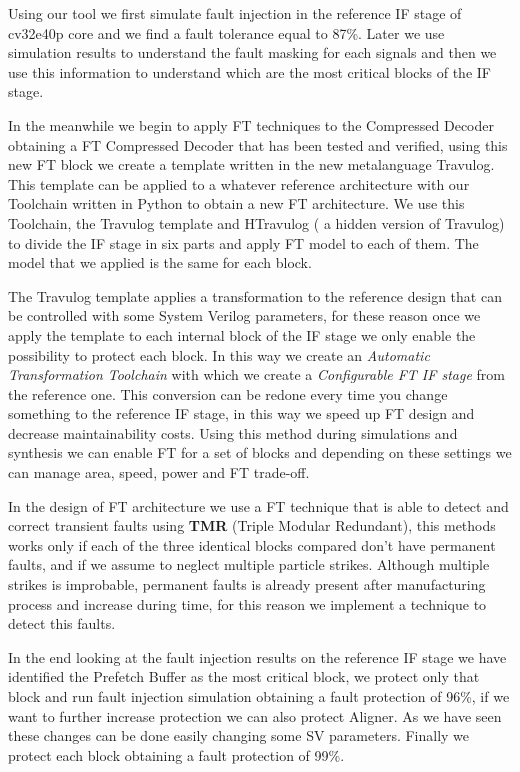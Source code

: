 \documentclass[corpo=11pt,english,numerazioneromana]{toptesi}
\begin{document}
Using our tool we first simulate fault injection in the reference IF stage of cv32e40p core and we find a fault tolerance equal to 87\%. Later we use simulation results to understand the fault masking for each signals and then we use this information to understand which are the most critical blocks of the IF stage. 

In the meanwhile we begin to apply FT techniques to the Compressed Decoder obtaining a FT Compressed Decoder that has been tested and verified, using this new FT block we create a template written in the new metalanguage Travulog. This template can be applied to a whatever reference architecture with our Toolchain written in Python to obtain a new FT architecture. We use this Toolchain, the Travulog template and HTravulog ( a hidden version of Travulog) to divide the IF stage in six parts and apply FT model to each of them. The model that we applied is the same for each block.

The Travulog template applies a transformation to the reference design that can be controlled with some System Verilog parameters, for these reason once we apply the template to each internal block of the IF stage we only enable the possibility to protect each block. In this way we create an \textit{Automatic Transformation Toolchain} with which we create a \textit{Configurable FT IF stage} from the reference one. This conversion can be redone every time you change something to the reference IF stage, in this way we speed up FT design and decrease maintainability costs. Using this method during simulations and synthesis we can enable FT for a set of blocks and depending on these settings we can manage area, speed, power and FT trade-off.
 
In the design of FT architecture we use a FT technique that is able to detect and correct transient faults using \textbf{ TMR} (Triple Modular Redundant), this methods works only if each of the three identical blocks compared don't have permanent faults, and if we assume to neglect multiple particle strikes. Although multiple strikes is improbable, permanent faults is already present after manufacturing process and increase during time, for this reason we implement a technique to detect this faults. 

In the end looking at the fault injection results on the reference IF stage we have identified the Prefetch Buffer as the most critical block, we protect only that block and run fault injection simulation obtaining a fault protection of 96\%, if we want to further increase protection we can also protect Aligner. As we have seen these changes can be done easily changing some SV parameters. Finally we protect each block obtaining a fault protection of 99\%.
\end{document}
